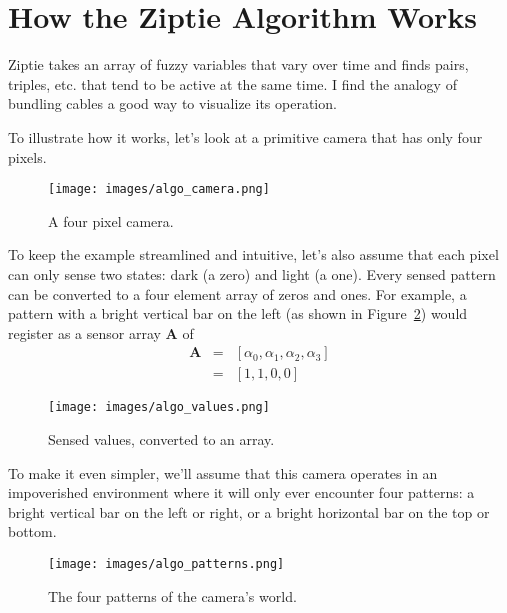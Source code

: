 \section{How the Ziptie Algorithm Works}
\label{sec:algorithm}

Ziptie takes an array of fuzzy variables that vary over time
and finds pairs, triples, etc.
that tend to be active at the same time. I find the analogy of bundling
cables a good way to visualize its operation.

To illustrate how it works, let's look at a primitive camera that has
only four pixels.

\begin{figure}[ht]
\vskip 0.2in
\begin{center}
\centerline{\texttt{[image: images/algo\_camera.png]}}
\caption{A four pixel camera.}
\label{fig:algocamera}
\end{center}
\vskip -0.2in
\end{figure}

To keep the example streamlined and intuitive, let's also assume that
each pixel can only sense two states: dark (a zero) and light (a one).
Every sensed pattern can be converted to a four element array of 
zeros and ones.
For example, a pattern with a bright vertical bar on the left 
(as shown in Figure~\ref{fig:algovalues}) would
register as a sensor array $\mathbf{A}$ of
\begin{eqnarray}
\mathbf{A} &=& [\alpha_0, \alpha_1, \alpha_2, \alpha_3]\\
&=& [1, 1, 0, 0]
\end{eqnarray}
\begin{figure}[ht]
\vskip 0.2in
\begin{center}
\centerline{\texttt{[image: images/algo\_values.png]}}
\caption{Sensed values, converted to an array.}
\label{fig:algovalues}
\end{center}
\vskip -0.2in
\end{figure}

To make it even simpler, we'll assume that this camera operates
in an impoverished environment where it will only ever encounter four
patterns: a bright vertical bar on the left or right, or a bright horizontal
bar on the top or bottom.

\begin{figure}[ht]
\vskip 0.2in
\begin{center}
\centerline{\texttt{[image: images/algo\_patterns.png]}}
\caption{The four patterns of the camera's world.}
\label{fig:algopatterns}
\end{center}
\vskip -0.2in
\end{figure}


